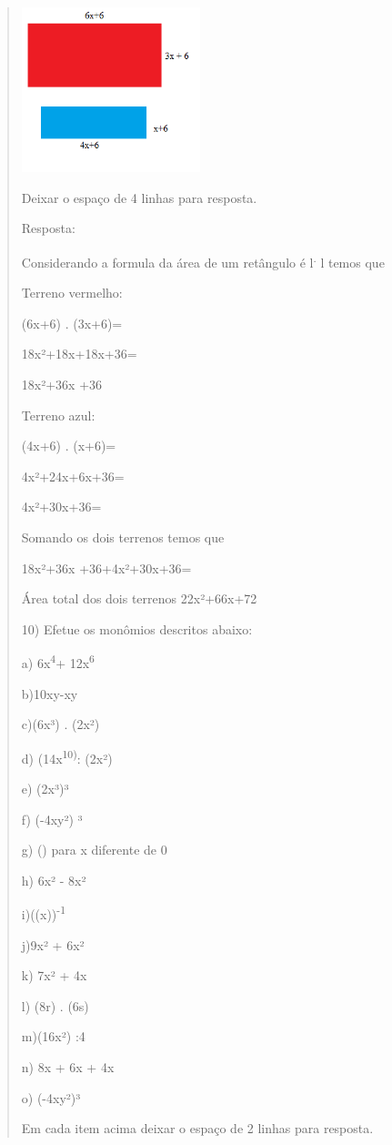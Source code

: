 \begin{quote}
\begin{escolha}
\includegraphics[width=2.04167in,height=1.8873in]{./imgSAEB_8_MAT/media/image5.png}

Deixar o espaço de 4 linhas para resposta.

Resposta:

Considerando a formula da área de um retângulo é l\textsuperscript{.} l
temos que

Terreno vermelho:

(6x+6) . (3x+6)=

18x²+18x+18x+36=

18x²+36x +36

Terreno azul:

(4x+6) . (x+6)=

4x²+24x+6x+36=

4x²+30x+36=

Somando os dois terrenos temos que

18x²+36x +36+4x²+30x+36=

Área total dos dois terrenos 22x²+66x+72

10) Efetue os monômios descritos abaixo:

a) 6x\textsuperscript{4}+ 12x\textsuperscript{6}

b)10xy-xy

c)(6x³) . (2x²)

d) (14x\textsuperscript{10)}: (2x²)

e) (2x³)³

f) (-4xy²) ³

g) () para x diferente de 0

h) 6x² - 8x²

i)((x))\textsuperscript{-1}

j)9x² + 6x²

k) 7x² + 4x

l) (8r) . (6s)

m)(16x²) :4

n) 8x + 6x + 4x

o) (-4xy²)³

Em cada item acima deixar o espaço de 2 linhas para resposta.


\end{escolha}
\end{quote}

